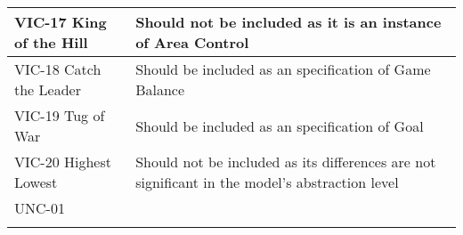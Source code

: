 \begin{longtable}{|m{7cm}|m{7cm}|}
        \hline
        VIC-17 King of the Hill & Should not be included as it is an instance of Area Control \\
        \hline
        VIC-18 Catch the Leader & Should be included as an specification of Game Balance \\
        \hline
        VIC-19 Tug of War & Should be included as an specification of Goal \\
        \hline
        VIC-20 Highest Lowest & Should not be included as its differences are not significant in the model's abstraction level \\
        \hline
        UNC-01  &  \\
        \hline
         &  \\
        
    \end{longtable}

